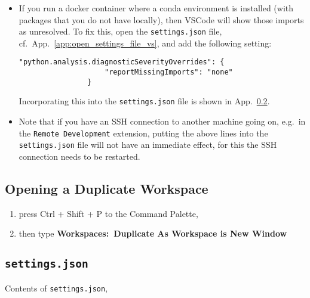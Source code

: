 \documentclass[12pt, a4paper]{article}
\numberwithin{equation}{section}
\theoremstyle{definition}
\theoremstyle{definition}
\begin{document}
		\begin{itemize}
			\item If you run a docker container where a conda environment is installed (with packages that you do not have locally), then VSCode will show those imports as unresolved. To fix this, open the \texttt{settings.json} file, cf.~App.~\ref{app:open_settings_file_vs}, and add the following setting: 
			
			\begin{lstlisting}[style=mystylepython, label=alg:vscode_pylance__unresolved_imports, xleftmargin=\parindent]
				"python.analysis.diagnosticSeverityOverrides": {
				    "reportMissingImports": "none"                          
				}
			\end{lstlisting}
			
			Incorporating this into the \texttt{settings.json} file is shown in App.~\ref{app:vscode__settings_file}.
			
			\item Note that if you have an SSH connection to another machine going on, e.g.~in the \texttt{Remote Development} extension, putting the above lines into the \texttt{settings.json} file will not have an immediate effect, for this the SSH connection needs to be restarted.
			
		\end{itemize}
	
	\subsection{Opening a Duplicate Workspace}
	
	\begin{enumerate}
		\item press Ctrl + Shift + P to the Command Palette, 
		\item then type \textbf{Workspaces:~Duplicate As Workspace is New Window}
	\end{enumerate}
	
	\subsection{\texttt{settings.json}} \label{app:vscode__settings_file}
		Contents of \texttt{settings.json},
	
\end{document}
